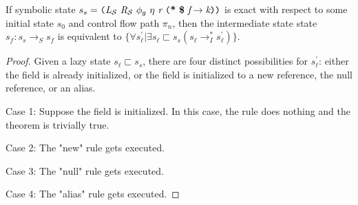 \begin{lemma}
\label{lem:init}
If symbolic state $s_s = \lp \cfgnt{L}_{\mathcal{S}}\ \cfgnt{R}_{\mathcal{S}}\ \phi_g\ \eta\ \cfgnt{r}\ \lp \cfgt{*}\ \cfgt{\$}\ \cfgnt{f} \rightarrow \cfgnt{k}\rp \rp$ is exact with respect to some initial state $s_0$ and control flow path $\pi_n$, then the intermediate state state $s_f : s_s \rightarrow_S s_f$ is equivalent to $\{\forall s_\ell^\prime | \exists s_\ell \sqsubset s_s (s_\ell \rightarrow_I^* s_\ell^\prime)  \}$.
\end{lemma}

\begin{proof}%
Given a lazy state $s_\ell \sqsubset s_s$, there are four distinct possibilities for $s_\ell^\prime$: either the field is already initialized, or the field is initialized to a new reference, the null reference, or an alias.

Case 1: Suppose the field is initialized. In this case, the rule does nothing and the theorem is trivially true.


Case 2: The "new" rule gets executed. 

Case 3: The "null" rule gets executed.

Case 4: The "alias" rule gets executed.
\end{proof}

